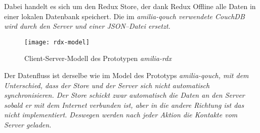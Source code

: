 Dabei handelt es sich um den Redux Store, der dank Redux Offline alle Daten in einer lokalen Datenbank speichert.
Die im \it{amilia-qouch} verwendete CouchDB wird durch den Server und einer \gls{JSON}--Datei ersetzt.
%
\begin{figure}[H]
  \centering
  \texttt{[image: rdx-model]}
  \grayRule
  \caption{Client-Server-Modell des Prototypen \it{amilia-rdx}}
  \label{fig:rdx-model}
\end{figure}
% 
Der Datenfluss ist derselbe wie im Model des Prototyps \it{amilia-qouch}, mit dem Unterschied, dass der Store und der Server sich nicht automatisch synchronisieren.
Der Store schickt zwar automatisch die Daten an den Server sobald er mit dem Internet verbunden ist, aber in die andere Richtung ist das nicht implementiert.
Deswegen werden nach jeder Aktion die Kontakte vom Server geladen.
